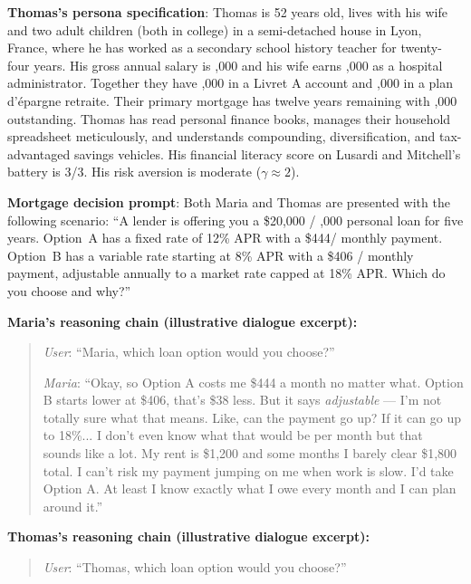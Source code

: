 \begin{context}
\begin{example}
\textbf{Thomas's persona specification}: Thomas is 52 years old, lives with his wife and two adult children (both in college) in a semi-detached house in Lyon, France, where he has worked as a secondary school history teacher for twenty-four years. His gross annual salary is ,000 and his wife earns ,000 as a hospital administrator. Together they have ,000 in a Livret A account and ,000 in a plan d'épargne retraite. Their primary mortgage has twelve years remaining with ,000 outstanding. Thomas has read personal finance books, manages their household spreadsheet meticulously, and understands compounding, diversification, and tax-advantaged savings vehicles. His financial literacy score on Lusardi and Mitchell's battery is 3/3. His risk aversion is moderate ($\gamma \approx 2$).

\medskip
\textbf{Mortgage decision prompt}: Both Maria and Thomas are presented with the following scenario: ``A lender is offering you a \$20,000 / ,000 personal loan for five years. Option~A has a fixed rate of 12\% APR with a \$444/ monthly payment. Option~B has a variable rate starting at 8\% APR with a \$406 /  monthly payment, adjustable annually to a market rate capped at 18\% APR. Which do you choose and why?''

\medskip
\textbf{Maria's reasoning chain (illustrative dialogue excerpt):}

\begin{quote}
\textit{User}: ``Maria, which loan option would you choose?''

\textit{Maria}: ``Okay, so Option A costs me \$444 a month no matter what. Option B starts lower at \$406, that's \$38 less. But it says \emph{adjustable} --- I'm not totally sure what that means. Like, can the payment go up? If it can go up to 18\%... I don't even know what that would be per month but that sounds like a lot. My rent is \$1,200 and some months I barely clear \$1,800 total. I can't risk my payment jumping on me when work is slow. I'd take Option A. At least I know exactly what I owe every month and I can plan around it.''
\end{quote}

\textbf{Thomas's reasoning chain (illustrative dialogue excerpt):}

\begin{quote}
\textit{User}: ``Thomas, which loan option would you choose?''


\end{quote}
\end{example}
\end{context}
